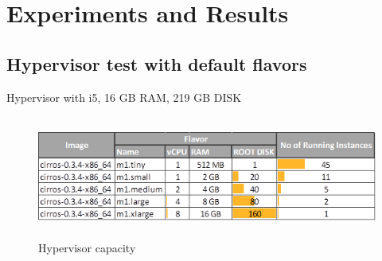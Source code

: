 
\chapter{Experiments and Results}
\section{Hypervisor test with default flavors}

Hypervisor with i5, 16 GB RAM, 219 GB DISK

\begin{figure}[h]
    \centering
    \includegraphics[width=15cm,height=4cm]{images/default_flavor2.png}
    \caption{Hypervisor capacity}
\end{figure}